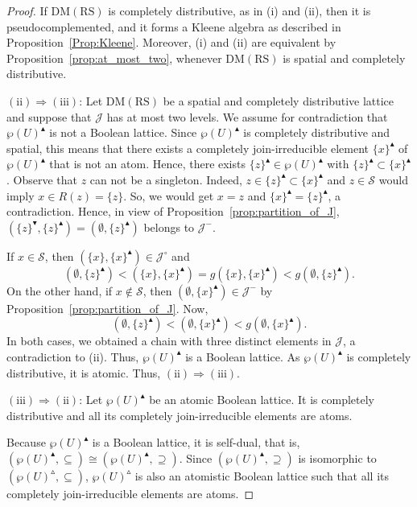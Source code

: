 \documentclass[11pt,a4paper]{amsart}
\newcommand{\UP}{\blacktriangle}
\newcommand{\DOWN}{\blacktriangledown}
\newcommand{\Up}{\vartriangle}
\theoremstyle{plain}
\theoremstyle{definition}
\theoremstyle{remark}
\numberwithin{equation}{section}
\begin{document}
\begin{proof} 
If $\mathrm{DM(RS)}$ is completely distributive, as in (i) and (ii), 
then it is pseudocomplemented, and it forms a Kleene algebra as described in 
Proposition~\ref{Prop:Kleene}. 
Moreover, (i) and (ii) 
are equivalent by Proposition~\ref{prop:at_most_two}, 
whenever $\mathrm{DM(RS)}$ is spatial and completely distributive.

\medskip\noindent%
$\mathrm{(ii)}\Rightarrow\mathrm{(iii)}$: 
Let $\mathrm{DM(RS)}$ be a spatial and completely distributive lattice and suppose that $\mathcal{J}$ has at most two levels.
We assume for contradiction that $\wp(U)^\UP$ is not a 
Boolean lattice. 
Since $\wp(U)^\UP$ is completely distributive and spatial, this
means that there exists a completely join-irreducible element $\{x\}^\UP$ of 
$\wp(U)^\UP$ that is not an atom. Hence, there exists $\{z\}^\UP \in \wp(U)^\UP$ with
$\{z\}^\UP \subset \{x\}^\UP$. Observe that $z$ can not
be a singleton. Indeed, $z\in\{z\}^\UP \subset
\{x\}^\UP$ and $z\in \mathcal{S}$ would imply $x\in R(z)=\{z\}$. So, we
would get $x = z$ and $\{x\}^\UP = \{z\}^\UP$, a contradiction. Hence, in
view of Proposition~\ref{prop:partition_of_J}, $(\{z\}^\DOWN,\{z\}^{\UP}) =
(\emptyset,\{z\}^\UP)$ belongs to  $\mathcal{J}^{-}$. 

If $x\in \mathcal{S}$, then $(\{x\},\{x\}^\UP)\in \mathcal{J}^{\circ}$ and
\[ (\emptyset,\{z\}^\UP) < (\{x\},\{x\}^\UP) = g(\{x\},\{x\}^\UP)
<  g(\emptyset,\{z\}^\UP).\]
On the other hand, if $x \notin \mathcal{S}$, then
$(\emptyset,\{x\}^\UP) \in \mathcal{J}^{-}$ by Proposition~\ref{prop:partition_of_J}. Now,
\[ (\emptyset,\{z\}^\UP) < (\emptyset,\{x\}^\UP) < g(\emptyset,\{x\}^\UP). \]
In both cases, we obtained a chain with three distinct
elements in $\mathcal{J}$, a contradiction to (ii). Thus, 
$\wp(U)^\UP$ is a Boolean lattice. As $\wp(U)^\UP$ is completely
distributive, it is atomic. Thus, $\mathrm{(ii)}\Rightarrow\mathrm{(iii)}$. 

\medskip\noindent%
$\mathrm{(iii)}\Rightarrow\mathrm{(ii)}$:
Let $\wp(U)^\UP$ be an atomic Boolean lattice. 
It is completely distributive and all its completely join-irreducible 
elements are atoms. 

Because $\wp(U)^\UP$ is a Boolean lattice, it is self-dual, 
that is, $(\wp(U)^\UP,\subseteq) \cong (\wp(U)^\UP,\supseteq)$.
Since $(\wp(U)^\UP,\supseteq)$ is isomorphic to 
$(\wp(U)^{\Up}, \subseteq)$, $\wp(U)^{\Up}$ is also an 
atomistic Boolean lattice such that all its completely 
join-irreducible elements are atoms. 


\end{proof}
\end{document}
